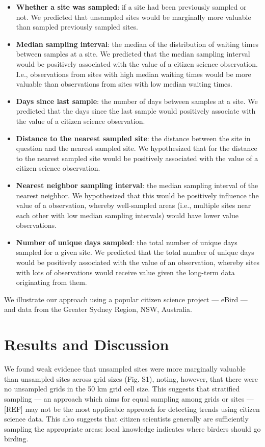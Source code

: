 \documentclass[9pt,twocolumn,twoside,lineno]{pnas-new}
\begin{document}
\begin{itemize}
  \item \textbf{Whether a site was sampled}: if a site had been previously sampled or not. We predicted that unsampled sites would be marginally more valuable than sampled previously sampled sites.
  \item \textbf{Median sampling interval}: the median of the distribution of waiting times between samples at a site. We predicted that the median sampling interval would be positively associated with the value of a citizen science observation. I.e., observations from sites with high median waiting times would be more valuable than observations from sites with low median waiting times.
  \item \textbf{Days since last sample}: the number of days between samples at a site. We predicted that the days since the last sample would positively associate with the value of a citizen science observation.
  \item \textbf{Distance to the nearest sampled site}: the distance between the site in question and the nearest sampled site. We hypothesized that for the distance to the nearest sampled site would be positively associated with the value of a citizen science observation.
  \item \textbf{Nearest neighbor sampling interval}: the median sampling interval of the nearest neighbor. We hypothesized that this would be positively influence the value of a observation, whereby well-sampled areas (i.e., multiple sites near each other with low median sampling intervals) would have lower value observations.
  \item \textbf{Number of unique days sampled}: the total number of unique days sampled for a given site. We predicted that the total number of unique days would be positively associated with the value of an observation, whereby sites with lots of observations would receive value given the long-term data originating from them.
\end{itemize}

We illustrate our approach using a popular citizen science project --- eBird \cite{sullivan2009ebird} --- and data from the Greater Sydney Region, NSW, Australia.

\section*{Results and Discussion}
We found weak evidence that unsampled sites were more marginally valuable than unsampled sites across grid sizes (Fig. S1), noting, however, that there were no unsampled grids in the 50 km grid cell size. This suggests that stratified sampling --- an approach which aims for equal sampling among grids or sites --- [REF] may not be the most applicable approach for detecting trends using citizen science data. This also suggests that citizen scientists generally are sufficiently sampling the appropriate areas: local knowledge indicates where birders should go birding.
\end{document}
